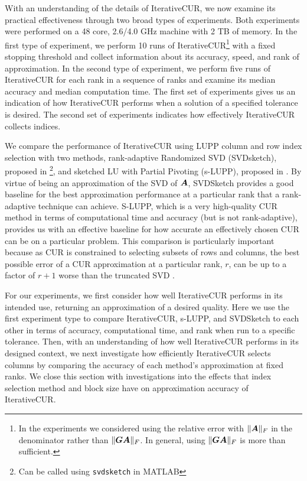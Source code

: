 With an understanding of the details of IterativeCUR, we now examine its practical effectiveness through two broad types of experiments. Both experiments were performed on a 48 core, 2.6/4.0 GHz machine with 2 TB of memory. In the first type of experiment, we perform 10 runs of IterativeCUR\footnote{In the experiments we considered using the relative error with $\|\boldsymbol{A}\|_F$ in the denominator rather than $\|\boldsymbol{G}\boldsymbol{A}\|_F$. In general, using $\|\boldsymbol{G} \boldsymbol{A}\|_F$ is more than sufficient.} with a fixed stopping threshold and collect information about its accuracy, speed, and rank of approximation. In the second type of experiment, we perform five runs of IterativeCUR for each rank in a sequence of ranks and examine its median accuracy and median computation time. The first set of experiments gives us an indication of how IterativeCUR performs when a solution of a specified tolerance is desired. The second set of experiments indicates how effectively IterativeCUR collects indices.

We compare the performance of IterativeCUR using LUPP column and row index selection with two methods, rank-adaptive Randomized SVD (SVDsketch), proposed in \cite{anderson2016efficient} \footnote{ Can be called using \texttt{svdsketch} in MATLAB}, and sketched LU with Partial Pivoting (s-LUPP), proposed in \cite{dong2023simpler}. By virtue of being an approximation of the SVD of $\boldsymbol{A}$, SVDSketch provides a good baseline for the best approximation performance at a particular rank that a rank-adaptive technique can achieve. S-LUPP, which is a very high-quality CUR method in terms of computational time and accuracy (but is not rank-adaptive), provides us with an effective baseline for how accurate an effectively chosen CUR can be on a particular problem.  This comparison is particularly important because as CUR is constrained to selecting subsets of rows and columns, the best possible error of a CUR approximation at a particular rank, $r$, can be up to a factor of $r+1$ worse than the truncated SVD \cite{osinsky2025close}. 

For our experiments, we first consider how well IterativeCUR performs in its intended use, returning an approximation of a desired quality. Here we use the first experiment type to compare IterativeCUR, s-LUPP, and SVDSketch to each other in terms of accuracy, computational time, and rank when run to a specific tolerance. Then, with an understanding of how well IterativeCUR performs in its designed context, we next investigate how efficiently IterativeCUR selects columns by comparing the accuracy of each method's approximation at fixed ranks. We close this section with investigations into the effects that index selection method and block size have on approximation accuracy of IterativeCUR.

